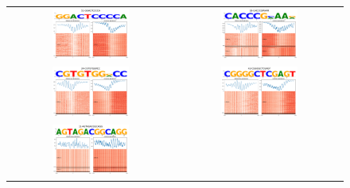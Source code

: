 \documentclass[11pt]{book}
\begin{document}
\begin{figure}[htbp]
    \centering
    \begin{tabular}{cc}
        \includegraphics[width=0.48\textwidth]{Figures/Results/xstreme_onrep_meta_hm/51-GGACTCCCCA.pdf} &
        \includegraphics[width=0.48\textwidth]{Figures/Results/xstreme_onrep_meta_hm/18-CACCCGMAAR.pdf} \\
        \includegraphics[width=0.48\textwidth]{Figures/Results/xstreme_onrep_meta_hm/24-CGTGTGGRCC.pdf} &
        \includegraphics[width=0.48\textwidth]{Figures/Results/xstreme_onrep_meta_hm/42-CGGGGCTCGAGT.pdf} \\
        \includegraphics[width=0.48\textwidth]{Figures/Results/xstreme_onrep_meta_hm/11-AGTAGACGGCAGG.pdf} &

\end{tabular}
\end{figure}
\end{document}
